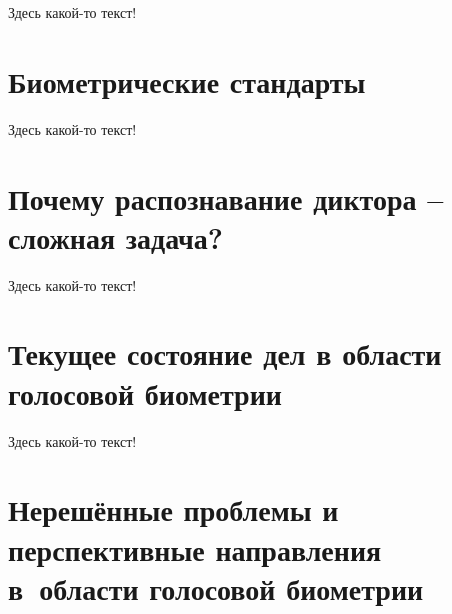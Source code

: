 \documentclass[12pt]{book}
\begin{document}
\large{Здесь какой-то текст!}

\section{Биометрические стандарты}

\large{Здесь какой-то текст!}

\section{Почему распознавание диктора -- сложная задача?}

\large{Здесь какой-то текст!}

\section{Текущее состояние дел в области голосовой биометрии}

\large{Здесь какой-то текст!}

\section{Нерешённые проблемы и перспективные направления в~области голосовой биометрии}
\end{document}

